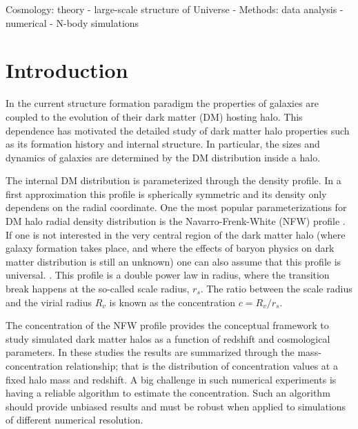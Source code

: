 \documentclass[a4,useAMS,usenatbib,usegraphicx]{mn2e}
\begin{document}
\begin{keywords}
Cosmology: theory - large-scale structure of Universe -
Methods: data analysis - numerical - N-body simulations
\end{keywords}


\section{Introduction}
\label{sec:introduction}
In the current structure formation paradigm the properties of galaxies
are coupled to the evolution of their dark matter (DM) hosting halo.
This dependence has motivated the detailed study of dark matter halo
properties such as its formation history and internal structure. 
In particular, the sizes and dynamics of galaxies are determined by
the DM distribution inside a halo.

The internal DM distribution is parameterized through the density
profile. 
In a first approximation this profile is spherically symmetric and
its density only dependens on the radial coordinate. 
One the most popular parameterizations for DM halo radial
density distribution is the Navarro-Frenk-White (NFW) profile
\citep{NFW}.   
If one is not interested in the very central region of the
dark matter halo (where galaxy formation takes place, and where the
effects of baryon physics on dark matter distribution is still an
unknown) one can also assume that this profile is universal.
\citep{Navarro2010}.  
 This profile is a double power law in radius, where the transition
break happens at the so-called scale radius, $r_s$.  
The ratio between the scale radius and the virial radius $R_v$ is
known as the concentration $c=R_v/r_s$. 


The concentration of the NFW profile provides the conceptual
framework to study simulated dark matter halos as a function of
redshift and cosmological parameters.
In these studies 
\citep{Neto2007,Maccio2008,Duffy2008,Munoz2011,Prada2012,Ludlow2014} 
the results are summarized through the
mass-concentration relationship; that is the distribution of
concentration values at a fixed halo mass and redshift.
A big challenge in such numerical experiments is having a
reliable algorithm to estimate the concentration. 
Such an algorithm should provide unbiased results and must be robust
when applied to simulations of different numerical resolution.  
\end{document}
